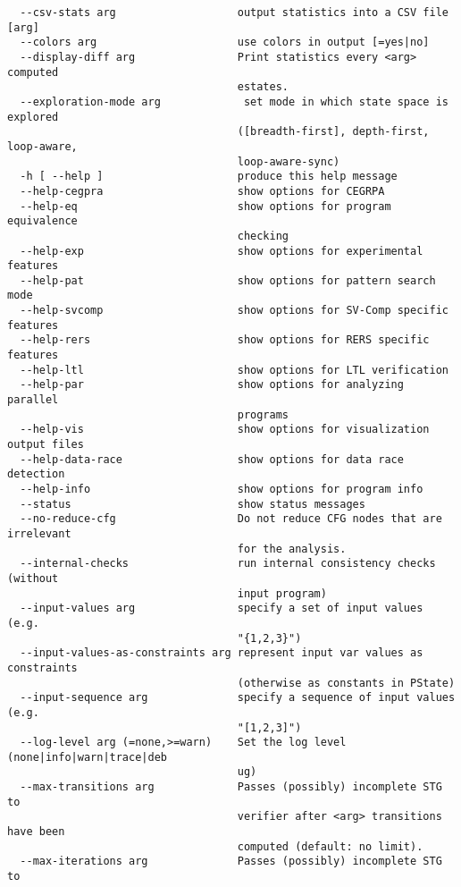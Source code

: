 \documentclass[natbib]{article}
\begin{document}
\begin{verbatim}
  --csv-stats arg                   output statistics into a CSV file [arg]
  --colors arg                      use colors in output [=yes|no]
  --display-diff arg                Print statistics every <arg> computed 
                                    estates.
  --exploration-mode arg             set mode in which state space is explored 
                                    ([breadth-first], depth-first, loop-aware, 
                                    loop-aware-sync)
  -h [ --help ]                     produce this help message
  --help-cegpra                     show options for CEGRPA
  --help-eq                         show options for program equivalence 
                                    checking
  --help-exp                        show options for experimental features
  --help-pat                        show options for pattern search mode
  --help-svcomp                     show options for SV-Comp specific features
  --help-rers                       show options for RERS specific features
  --help-ltl                        show options for LTL verification
  --help-par                        show options for analyzing parallel 
                                    programs
  --help-vis                        show options for visualization output files
  --help-data-race                  show options for data race detection
  --help-info                       show options for program info
  --status                          show status messages
  --no-reduce-cfg                   Do not reduce CFG nodes that are irrelevant
                                    for the analysis.
  --internal-checks                 run internal consistency checks (without 
                                    input program)
  --input-values arg                specify a set of input values (e.g. 
                                    "{1,2,3}")
  --input-values-as-constraints arg represent input var values as constraints 
                                    (otherwise as constants in PState)
  --input-sequence arg              specify a sequence of input values (e.g. 
                                    "[1,2,3]")
  --log-level arg (=none,>=warn)    Set the log level (none|info|warn|trace|deb
                                    ug)
  --max-transitions arg             Passes (possibly) incomplete STG to 
                                    verifier after <arg> transitions have been 
                                    computed (default: no limit).
  --max-iterations arg              Passes (possibly) incomplete STG to 

\end{verbatim}
\end{document}
